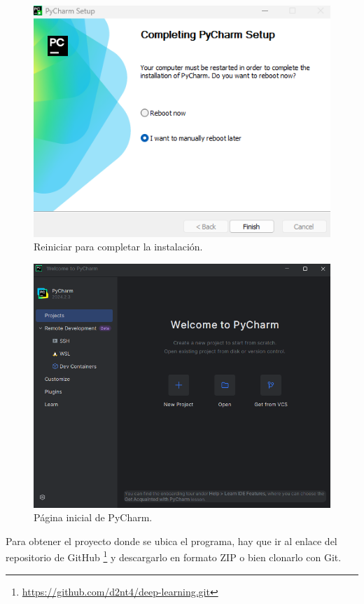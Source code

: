 \documentclass{article}
\begin{document}
\begin{figure}[H]
    \centering
    \includegraphics[scale=0.8]{py6.png}
    \caption{Reiniciar para completar la instalación.}
\end{figure}

\begin{figure}[H]
    \centering
    \includegraphics[scale=0.65]{py7.png}
    \caption{Página inicial de PyCharm.}
\end{figure}

\newpage

Para obtener el proyecto donde se ubica el programa, hay que ir al enlace del repositorio de GitHub \footnote{\url{https://github.com/d2nt4/deep-learning.git}} y descargarlo en formato ZIP o bien clonarlo con Git.
\end{document}
